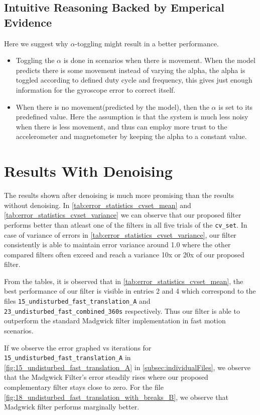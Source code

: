 \documentclass{iutbscthesis}
\begin{document}
\subsection{Intuitive Reasoning Backed by Emperical Evidence}
Here we suggest why $\alpha$-toggling might result in a better performance.
\begin{itemize}
    \item Toggling the $\alpha$ is done in scenarios when there is movement. When the model predicts there is some movement 
    instead of varying the alpha, the alpha is toggled according to defined duty cycle and frequency, this gives just enough information for the gyroscope error to correct itself.
    \item When there is no movement(predicted by the model), then the $\alpha$ is set to its predefined value. Here the assumption is that the system is much less noisy when there is less movement, and thus can employ more trust to the accelerometer and magnetometer by keeping the alpha to a constant value.
\end{itemize}


\section{Results With Denoising}

The results shown after denoising is much more promising than the results without denoising. In 
\autoref{tab:error_statistics_cvset_mean} and \autoref{tab:error_statistics_cvset_variance} we can observe 
that our proposed filter performs better than atleast one of the filters in all five trials of the \texttt{cv\_set}.
In case of variance of errors in \autoref{tab:error_statistics_cvset_variance}, our filter consistently is able to maintain error variance around 1.0 where the other compared 
filters often exceed and reach a variance 10x or 20x of our proposed filter.

From the tables, it is observed that in \autoref{tab:error_statistics_cvset_mean}, the best performance of
our filter is visible in entries 2 and 4 which correspond to the files \texttt{15\_undisturbed\_fast\_translation\_A} and \texttt{23\_undisturbed\_fast\_combined\_360s} respectively.
Thus our filter is able to outperform the standard Madgwick filter implementation in fast motion scenarios.

If we observe the error graphed vs iterations for \texttt{15\_undisturbed\_fast\_translation\_A} in \autoref{fig:15_undisturbed_fast_translation_A} in \autoref{subsec:individualFiles}, we observe that the
Madgwick Filter's error steadily rises where our proposed complementary filter stays close to zero. For the file \autoref{fig:18_undisturbed_fast_translation_with_breaks_B},
we observe that Madgwick filter performs marginally better.
\end{document}
